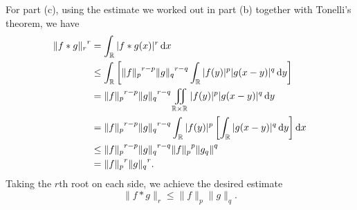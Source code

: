 \begin{solution}
  For part (c), using the estimate we worked out in part (b) together with
  Tonelli's theorem, we have
  \begin{align*}
    {\|f*g\|_r}^{\cramped{r}}
    &=\int_\bbR|f*g(x)|^r\diff x\\
    &\leq\int_\bbR
      \left[
      {\|f\|_p}^{\cramped{r-p}}{\|g\|_q}^{\cramped{r-q}}
      \int_\bbR|f(y)|^p|g(x-y)|^q\diff y
      \right]\\
    &={\|f\|_p}^{\cramped{r-p}}{\|g\|_q}^{\cramped{r-q}}
      \iint\limits_{\bbR\times\bbR}|f(y)|^p|g(x-y)|^q\diff
      y\\
    &={\|f\|_p}^{\cramped{r-p}}{\|g\|_q}^{\cramped{r-q}}
      \int_\bbR|f(y)|^p\left[\int_\bbR
      |g(x-y)|^q\diff y\right]\rmd x\\
    &\leq{\|f\|_p}^{\cramped r-p}{\|g\|_q}^{\cramped{r-q}}
      {\|f\|_p}^{\cramped{p}}{\|g_q\|}^{\cramped{q}}\\
    &={\|f\|_p}^{\cramped{r}}{\|g\|_q}^{\cramped{r}}.
  \end{align*}
  Taking the \(r\)th root on each side, we achieve the desired estimate
  \[
    \|f*g\|_r\leq \|f\|_p\|g\|_q.
  \]
\end{solution}

